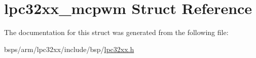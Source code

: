 \hypertarget{structlpc32xx__mcpwm}{}\section{lpc32xx\+\_\+mcpwm Struct Reference}
\label{structlpc32xx__mcpwm}


The documentation for this struct was generated from the following file\+:\begin{DoxyCompactItemize}
\item 
bsps/arm/lpc32xx/include/bsp/\mbox{\hyperlink{lpc32xx_8h}{lpc32xx.\+h}}\end{DoxyCompactItemize}
